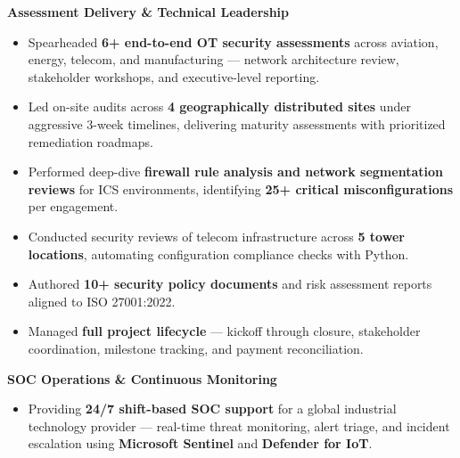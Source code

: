 \documentclass[10.5pt,a4paper]{article}
\newcommand{\subheading}[1]{\vspace{3pt}\textbf{#1}\vspace{1pt}}
\begin{document}
\subheading{Assessment Delivery \& Technical Leadership}
\begin{itemize}
  \item Spearheaded \textbf{6+ end-to-end OT security assessments} across aviation, energy, telecom, and manufacturing — network architecture review, stakeholder workshops, and executive-level reporting.
  \item Led on-site audits across \textbf{4 geographically distributed sites} under aggressive 3-week timelines, delivering maturity assessments with prioritized remediation roadmaps.
  \item Performed deep-dive \textbf{firewall rule analysis and network segmentation reviews} for ICS environments, identifying \textbf{25+ critical misconfigurations} per engagement.
  \item Conducted security reviews of telecom infrastructure across \textbf{5 tower locations}, automating configuration compliance checks with Python.
  \item Authored \textbf{10+ security policy documents} and risk assessment reports aligned to ISO 27001:2022.
  \item Managed \textbf{full project lifecycle} — kickoff through closure, stakeholder coordination, milestone tracking, and payment reconciliation.
\end{itemize}

\subheading{SOC Operations \& Continuous Monitoring}
\begin{itemize}
  \item Providing \textbf{24/7 shift-based SOC support} for a global industrial technology provider — real-time threat monitoring, alert triage, and incident escalation using \textbf{Microsoft Sentinel} and \textbf{Defender for IoT}.
\end{itemize}

\end{document}
